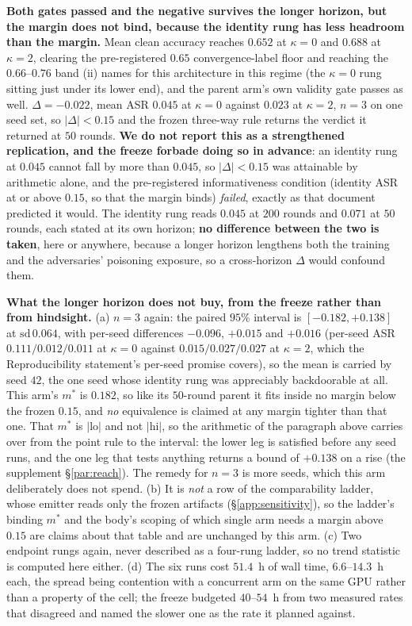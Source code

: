 \documentclass{article}
\begin{document}
\textbf{Both gates passed and the negative survives the longer horizon, but the margin does not bind, because the identity rung has less headroom than the margin.} Mean clean accuracy reaches $0.652$ at $\kappa{=}0$ and $0.688$ at $\kappa{=}2$, clearing the pre-registered $0.65$ convergence-label floor and reaching the $0.66$--$0.76$ band (ii) names for this architecture in this regime (the $\kappa{=}0$ rung sitting just under its lower end), and the parent arm's own validity gate passes as well. $\Delta = \mathbf{-0.022}$, mean ASR $0.045$ at $\kappa{=}0$ against $0.023$ at $\kappa{=}2$, $n{=}3$ on one seed set, so $|\Delta| < 0.15$ and the frozen three-way rule returns the verdict it returned at $50$ rounds. \textbf{We do not report this as a strengthened replication, and the freeze forbade doing so in advance}: an identity rung at $0.045$ cannot fall by more than $0.045$, so $|\Delta| < 0.15$ was attainable by arithmetic alone, and the pre-registered informativeness condition (identity ASR at or above $0.15$, so that the margin binds) \emph{failed}, exactly as that document predicted it would. The identity rung reads $0.045$ at $200$ rounds and $0.071$ at $50$ rounds, each stated at its own horizon; \textbf{no difference between the two is taken}, here or anywhere, because a longer horizon lengthens both the training and the adversaries' poisoning exposure, so a cross-horizon $\Delta$ would confound them.

\textbf{What the longer horizon does not buy, from the freeze rather than from hindsight.} (a) $n{=}3$ again: the paired $95\%$ interval is $[-0.182,+0.138]$ at $\mathrm{sd}\,0.064$, with per-seed differences $-0.096$, $+0.015$ and $+0.016$ (per-seed ASR $0.111/0.012/0.011$ at $\kappa{=}0$ against $0.015/0.027/0.027$ at $\kappa{=}2$, which the Reproducibility statement's per-seed promise covers), so the mean is carried by seed $42$, the one seed whose identity rung was appreciably backdoorable at all. This arm's $m^{\ast}$ is $0.182$, so like its $50$-round parent it fits inside no margin below the frozen $0.15$, and \emph{no} equivalence is claimed at any margin tighter than that one. That $m^{\ast}$ is $|\mathrm{lo}|$ and not $|\mathrm{hi}|$, so the arithmetic of the paragraph above carries over from the point rule to the interval: the lower leg is satisfied before any seed runs, and the one leg that tests anything returns a bound of $+0.138$ on a rise (the supplement §\ref{par:reach}). The remedy for $n{=}3$ is more seeds, which this arm deliberately does not spend. (b) It is \emph{not} a row of the comparability ladder, whose emitter reads only the frozen artifacts (§\ref{app:sensitivity}), so the ladder's binding $m^{\ast}$ and the body's scoping of which single arm needs a margin above $0.15$ are claims about that table and are unchanged by this arm. (c) Two endpoint rungs again, never described as a four-rung ladder, so no trend statistic is computed here either. (d) The six runs cost $51.4$~h of wall time, $6.6$--$14.3$~h each, the spread being contention with a concurrent arm on the same GPU rather than a property of the cell; the freeze budgeted $40$--$54$~h from two measured rates that disagreed and named the slower one as the rate it planned against.
\end{document}
